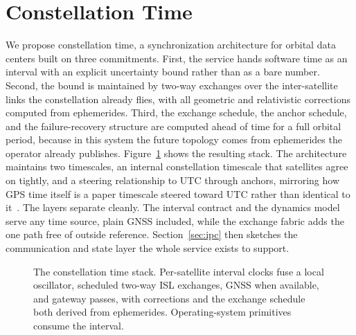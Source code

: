 \documentclass[twocolumn,10pt]{article}
\begin{document}
\section{Constellation Time}\label{sec:method}
We propose constellation time, a synchronization architecture for orbital data centers built on three commitments. First, the service hands software time as an interval with an explicit uncertainty bound rather than as a bare number. Second, the bound is maintained by two-way exchanges over the inter-satellite links the constellation already flies, with all geometric and relativistic corrections computed from ephemerides. Third, the exchange schedule, the anchor schedule, and the failure-recovery structure are computed ahead of time for a full orbital period, because in this system the future topology comes from ephemerides the operator already publishes. Figure~\ref{fig:arch} shows the resulting stack. The architecture maintains two timescales, an internal constellation timescale that satellites agree on tightly, and a steering relationship to UTC through anchors, mirroring how GPS time itself is a paper timescale steered toward UTC rather than identical to it~\cite{gpssps}. The layers separate cleanly. The interval contract and the dynamics model serve any time source, plain GNSS included, while the exchange fabric adds the one path free of outside reference. Section~\ref{sec:ipc} then sketches the communication and state layer the whole service exists to support.

\begin{figure}[t]
\centering
\resizebox{\columnwidth}{!}{}
\caption{The constellation time stack. Per-satellite interval clocks fuse a local oscillator, scheduled two-way ISL exchanges, GNSS when available, and gateway passes, with corrections and the exchange schedule both derived from ephemerides. Operating-system primitives consume the interval.}
\label{fig:arch}
\end{figure}
\end{document}
